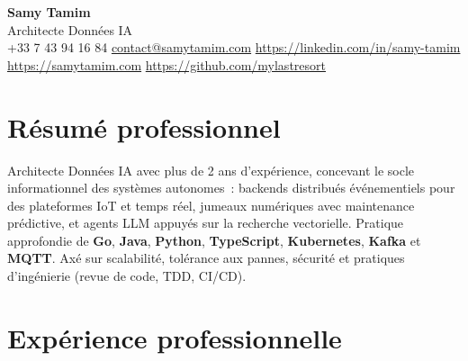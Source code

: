 \documentclass[10pt,a4paper]{article}
\newcommand{\skill}[1]{\textbf{#1}}
\newcommand{\skill}[1]{\textbf{#1}}
\begin{document}
\begin{center}
  {\LARGE\bfseries\color{accent} Samy Tamim}\\[1.5pt]
  {\small Architecte Données IA}\\[1.5pt]
  \footnotesize
  +33 7 43 94 16 84 \enspace\textbullet\enspace \href{mailto:contact@samytamim.com}{contact@samytamim.com} \enspace\textbullet\enspace \href{https://linkedin.com/in/samy-tamim}{https://linkedin.com/in/samy-tamim} \enspace\textbullet\enspace \href{https://samytamim.com}{https://samytamim.com} \enspace\textbullet\enspace \href{https://github.com/mylastresort}{https://github.com/mylastresort}
\end{center}

\section{Résumé professionnel}
Architecte Données IA avec plus de 2 ans d'expérience, concevant le socle informationnel des systèmes autonomes~: backends distribués événementiels pour des plateformes IoT et temps réel, jumeaux numériques avec maintenance prédictive, et agents LLM appuyés sur la recherche vectorielle. Pratique approfondie de \skill{Go}, \skill{Java}, \skill{Python}, \skill{TypeScript}, \skill{Kubernetes}, \skill{Kafka} et \skill{MQTT}. Axé sur scalabilité, tolérance aux pannes, sécurité et pratiques d'ingénierie (revue de code, TDD, CI/CD).

\section{Expérience professionnelle}
\end{document}
